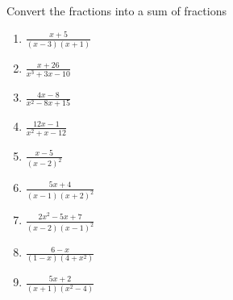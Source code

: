 \documentclass[../main.tex]{subfiles}
\begin{document}
Convert the fractions into a sum of fractions
\begin{enumerate}[itemsep=1cm]
    \item 
    $\frac{x+5}{(x-3)(x+1)}$

    \item 
    $\frac{x+26}{x^3+3x-10}$

    \item 
    $\frac{4x-8}{x^2-8x+15}$

    \item 
    $\frac{12x-1}{x^2+x-12}$

    \item 
    $\frac{x-5}{(x-2)^2}$

    \item 
    $\frac{5x+4}{(x-1)(x+2)^2}$

    \item 
    $\frac{2x^2-5x+7}{(x-2)(x-1)^2}$

    \item 
    $\frac{6-x}{(1-x)(4+x^2)}$

    \item 
    $\frac{5x+2}{(x+1)(x^2-4)}$
\end{enumerate}
\end{document}
